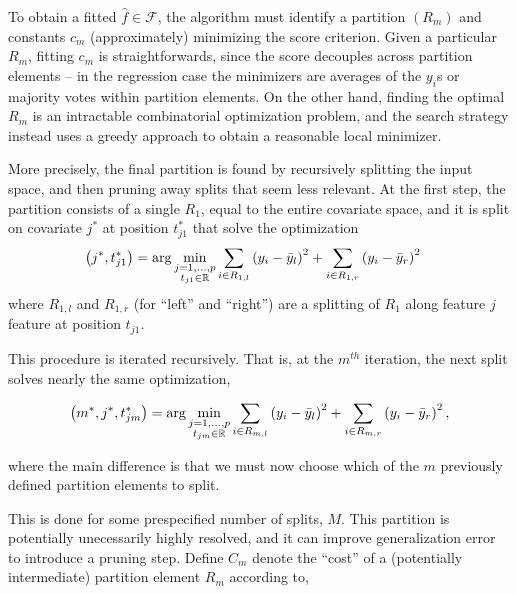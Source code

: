 \documentclass{article}
\begin{document}
To obtain a fitted $\hat{f} \in \mathcal{F}$, the algorithm must identify a
partition $\left(R_{m}\right)$ and constants $c_{m}$ (approximately) minimizing
the score criterion. Given a particular $R_{m}$, fitting $c_{m}$ is
straightforwards, since the score decouples across partition elements -- in the
regression case the minimizers are averages of the $y_{i}$s or majority votes
within partition elements. On the other hand, finding the optimal $R_{m}$ is an
intractable combinatorial optimization problem, and the search strategy instead
uses a greedy approach to obtain a reasonable local minimizer.

More precisely, the final partition is found by recursively splitting the
input space, and then pruning away splits that seem less relevant. At the first
step, the partition consists of a single $R_{1}$, equal to the entire covariate
space, and it is split on covariate $j^{\ast}$ at position $t_{j1}^{\ast}$
that solve the optimization
\begin{align*}
  \left(j^{\ast}, t_{j1}^{\ast}\right) &= \arg \min_{\substack{j = 1, \dots, p \\ t_{j1} \in \mathbb{R}}} \sum_{i \in R_{1, l}} \left(y_{i} - \bar{y}_{l}\right)^{2} + \sum_{i \in R_{1, r}} \left(y_{i} - \bar{y}_{r}\right)^{2}
\end{align*}
where $R_{1, l}$ and $R_{1, r}$ (for ``left'' and ``right'') are a splitting of
$R_{1}$ along feature $j$ feature at position $t_{j1}$.

This procedure is iterated recursively. That is, at the $m^{th}$ iteration, the
next split solves nearly the same optimization,

\begin{align*}
  \left(m^{\ast}, j^{\ast}, t_{jm}^{\ast}\right) = \arg \min_{\substack{j = 1, \dots, p \\ t_{jm} \in \mathbb{R}}}
  \sum_{i \in R_{m, l}} \left(y_{i} - \bar{y}_{l}\right)^{2} +
  \sum_{i \in R_{m, r}} \left(y_{i} - \bar{y}_{r}\right)^{2},
\end{align*}

where the main difference is that we must now choose which of the $m$ previously
defined partition elements to split.

This is done for some prespecified number of splits, $M$. This partition is
potentially unecessarily highly resolved, and it can improve generalization
error to introduce a pruning step. Define $C_{m}$ denote the ``cost'' of a
(potentially intermediate) partition element $R_{m}$ according to,
\end{document}
